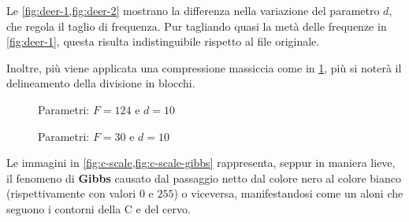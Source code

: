 \documentclass[11pt,italian]{article}
\begin{document}
Le \cref{fig:deer-1,fig:deer-2} mostrano la differenza nella variazione del parametro $d$, che regola il taglio di frequenza.
Pur tagliando quasi la metà delle frequenze in \cref{fig:deer-1}, questa risulta indistinguibile rispetto al file originale.

Inoltre, più viene applicata una compressione massiccia come in \cref{fig:deer-2}, più si noterà il delineamento della divisione in blocchi.

\begin{figure}[H]
    \caption{Parametri: $F=124$ e $d=10$}
    \label{fig:deer-2}
\end{figure}

\begin{figure}[H]
    \caption{Parametri: $F=30$ e $d=10$}
    \label{fig:c-scale}
\end{figure}

\vfill
\noindent
Le immagini in \cref{fig:c-scale,fig:c-scale-gibbs} rappresenta, seppur in maniera lieve, il fenomeno di \textbf{Gibbs} causato dal passaggio netto dal colore nero al colore bianco (rispettivamente con valori $0$ e $255$) o viceversa, manifestandosi come un aloni che seguono i contorni della C e del cervo.
\end{document}
